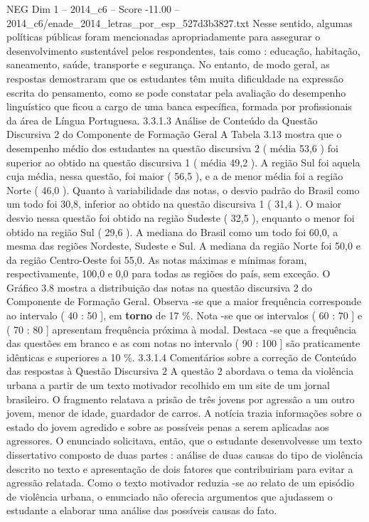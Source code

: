 \begin{textsample}{NEG Dim 1 – 2014\_c6 – Score -11.00 – 2014\_c6/enade\_2014\_letras\_por\_esp\_527d3b3827.txt}
Nesse sentido, algumas políticas públicas foram mencionadas apropriadamente para assegurar o desenvolvimento sustentável pelos respondentes, tais como : educação, habitação, saneamento, saúde, transporte e segurança.
No entanto, de modo geral, as respostas demostraram que os estudantes têm muita dificuldade na expressão escrita do pensamento, como se pode constatar pela avaliação do desempenho linguístico que ficou a cargo de uma banca específica, formada por profissionais da área de Língua Portuguesa. 3.3.1.3 Análise de Conteúdo da Questão Discursiva 2 do Componente de Formação Geral A Tabela 3.13 mostra que o desempenho médio dos estudantes na questão discursiva 2 ( média 53,6 ) foi superior ao obtido na questão discursiva 1 ( média 49,2 ).
A região Sul foi aquela cuja média, nessa questão, foi maior ( 56,5 ), e a de menor média foi a região Norte ( 46,0 ).
Quanto à variabilidade das notas, o desvio padrão do Brasil como um todo foi 30,8, inferior ao obtido na questão discursiva 1 ( 31,4 ).
O maior desvio nessa questão foi obtido na região Sudeste ( 32,5 ), enquanto o menor foi obtido na região Sul ( 29,6 ).
A mediana do Brasil como um todo foi 60,0, a mesma das regiões Nordeste, Sudeste e Sul.
A mediana da região Norte foi 50,0 e da região Centro-Oeste foi 55,0.
As notas máximas e mínimas foram, respectivamente, 100,0 e 0,0 para todas as regiões do país, sem exceção.
O Gráfico 3.8 mostra a distribuição das notas na questão discursiva 2 do Componente de Formação Geral.
Observa -se que a maior frequência corresponde ao intervalo ( 40 : 50 ], em \textbf{torno} de 17 \%.
Nota -se que os intervalos ( 60 : 70 ] e ( 70 : 80 ] apresentam frequência próxima à modal.
Destaca -se que a frequência das questões em branco e as com notas no intervalo ( 90 : 100 ] são praticamente idênticas e superiores a 10 \%. 3.3.1.4 Comentários sobre a correção de Conteúdo das respostas à Questão Discursiva 2 A questão 2 abordava o tema da violência urbana a partir de um texto motivador recolhido em um site de um jornal brasileiro.
O fragmento relatava a prisão de três jovens por agressão a um outro jovem, menor de idade, guardador de carros.
A notícia trazia informações sobre o estado do jovem agredido e sobre as possíveis penas a serem aplicadas aos agressores.
O enunciado solicitava, então, que o estudante desenvolvesse um texto dissertativo composto de duas partes : análise de duas causas do tipo de violência descrito no texto e apresentação de dois fatores que contribuiriam para evitar a agressão relatada.
Como o texto motivador reduzia -se ao relato de um episódio de violência urbana, o enunciado não oferecia argumentos que ajudassem o estudante a elaborar uma análise das possíveis causas do fato.

\end{textsample}
